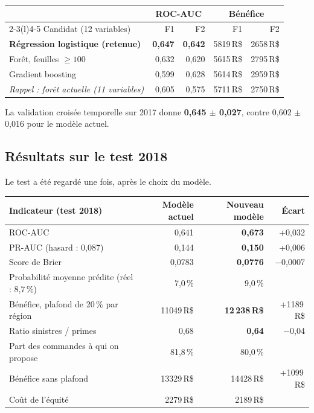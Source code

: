 \documentclass[11pt,a4paper]{article}
\newcommand{\RS}{\,R\$}
\begin{document}
\begin{center}
\begin{tabular}{@{}lrrrr@{}}
\toprule
& \multicolumn{2}{c}{ROC-AUC} & \multicolumn{2}{c}{Bénéfice} \\
\cmidrule(lr){2-3}\cmidrule(l){4-5}
Candidat (12 variables) & F1 & F2 & F1 & F2 \\
\midrule
\textbf{Régression logistique (retenue)} & \textbf{0,647} & \textbf{0,642} & \num{5819}\RS{} & \num{2658}\RS{} \\
Forêt, feuilles $\geq 100$ & 0,632 & 0,620 & \num{5615}\RS{} & \num{2795}\RS{} \\
Gradient boosting & 0,599 & 0,628 & \num{5614}\RS{} & \num{2959}\RS{} \\
\midrule
\emph{Rappel : forêt actuelle (11 variables)} & 0,605 & 0,575 & \num{5711}\RS{} & \num{2750}\RS{} \\
\bottomrule
\end{tabular}
\end{center}

La validation croisée temporelle sur 2017 donne \textbf{0,645 $\pm$ 0,027}, contre
0,602 $\pm$ 0,016 pour le modèle actuel.

\subsection{Résultats sur le test 2018}

Le test a été regardé une fois, après le choix du modèle.

\begin{center}
\begin{tabular}{@{}lrrr@{}}
\toprule
Indicateur (test 2018) & Modèle actuel & Nouveau modèle & Écart \\
\midrule
ROC-AUC & 0,641 & \textbf{0,673} & +0,032 \\
PR-AUC (hasard : 0,087) & 0,144 & \textbf{0,150} & +0,006 \\
Score de Brier & 0,0783 & \textbf{0,0776} & $-$0,0007 \\
Probabilité moyenne prédite (réel : 8,7\,\%) & 7,0\,\% & 9,0\,\% & \\
\midrule
Bénéfice, plafond de 20\,\% par région & \num{11049}\RS{} & \textbf{12\,238\RS{}} & +\num{1189}\RS{} \\
Ratio sinistres / primes & 0,68 & \textbf{0,64} & $-$0,04 \\
Part des commandes à qui on propose & 81,8\,\% & 80,0\,\% & \\
Bénéfice sans plafond & \num{13329}\RS{} & \num{14428}\RS{} & +\num{1099}\RS{} \\
Coût de l'équité & \num{2279}\RS{} & \num{2189}\RS{} & \\
\bottomrule
\end{tabular}
\end{center}
\end{document}

